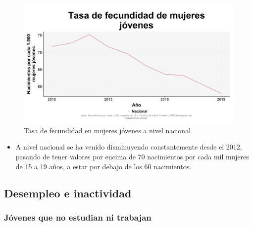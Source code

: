     \begin{figure}[H]
        \caption{Tasa de fecundidad en mujeres jóvenes a nivel nacional \label{map_result_2} }
        \begin{center}
        \includegraphics[width=\textwidth,keepaspectratio]{img/var_283_trend.png}
        \end{center}
    \end{figure}
            \begin{itemize}
                \item A nivel nacional se ha venido disminuyendo constantemente desde el 2012, pasando de tener valores por encima de 70 nacimientos por cada mil mujeres de 15 a 19 años, a estar por debajo de los 60 nacimientos.
                \end{itemize}

    \subsection{Desempleo e inactividad}
        \subsubsection{Jóvenes que no estudian ni trabajan}

